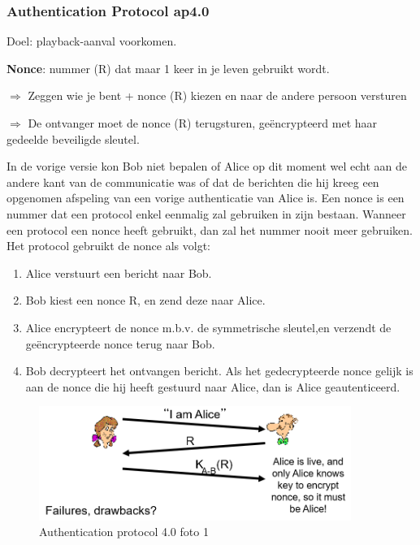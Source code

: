 \newpage

\subsubsection{Authentication Protocol ap4.0}

\noindent Doel: playback-aanval voorkomen.

\noindent \textbf{Nonce}: nummer (R) dat maar 1 keer in je leven gebruikt wordt.

\noindent $\Rightarrow$ Zeggen wie je bent + nonce (R) kiezen en naar de andere persoon versturen

\noindent $\Rightarrow$ De ontvanger moet de nonce (R) terugsturen, geëncrypteerd met haar gedeelde beveiligde sleutel.

\noindent In de vorige versie kon Bob niet bepalen of Alice op dit moment wel echt aan de andere kant van de communicatie was of dat de berichten die hij kreeg een opgenomen afspeling van een vorige authenticatie van Alice is. Een nonce is een nummer dat een protocol enkel eenmalig zal gebruiken in zijn bestaan. Wanneer een protocol een nonce heeft gebruikt, dan zal het nummer nooit meer gebruiken. Het protocol gebruikt de nonce als volgt:
\begin{enumerate}
    \item Alice verstuurt een bericht naar Bob.
\item Bob kiest een nonce R, en zend deze naar Alice.
\item Alice encrypteert de nonce m.b.v. de symmetrische sleutel,en verzendt de geëncrypteerde nonce terug naar Bob.
\item Bob decrypteert het ontvangen bericht. Als het gedecrypteerde nonce gelijk is aan de nonce die hij heeft gestuurd naar Alice, dan is Alice geautenticeerd.

\end{enumerate}

\begin{figure}[h]
    \centering
    \includegraphics[width=4in]{./img/imghfdst8/hfdst8puntje20.png}
    \caption{Authentication protocol 4.0 foto 1 }      
    \label{fig:Authentication protocol 4.0 foto 1 }
\end{figure}

